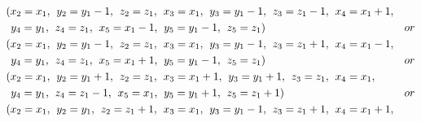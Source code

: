 \begin{align*}
&(x_{2}=x_{1},\hspace{1ex} y_{2}=y_{1}-1,\hspace{1ex} z_{2}=z_{1},\hspace{1ex} x_{3}=x_{1},\hspace{1ex} y_{3}=y_{1}-1,\hspace{1ex} z_{3}=z_{1}-1,\hspace{1ex} x_{4}=x_{1}+1,\\
&\hspace{1ex} y_{4}=y_{1},\hspace{1ex} z_{4}=z_{1},\hspace{1ex} x_{5}=x_{1}-1,\hspace{1ex} y_{5}=y_{1}-1,\hspace{1ex} z_{5}=z_{1})&or\\ 
&(x_{2}=x_{1},\hspace{1ex} y_{2}=y_{1}-1,\hspace{1ex} z_{2}=z_{1},\hspace{1ex} x_{3}=x_{1},\hspace{1ex} y_{3}=y_{1}-1,\hspace{1ex} z_{3}=z_{1}+1,\hspace{1ex} x_{4}=x_{1}-1,\\
&\hspace{1ex} y_{4}=y_{1},\hspace{1ex} z_{4}=z_{1},\hspace{1ex} x_{5}=x_{1}+1,\hspace{1ex} y_{5}=y_{1}-1,\hspace{1ex} z_{5}=z_{1})&or\\ 
&(x_{2}=x_{1},\hspace{1ex} y_{2}=y_{1}+1,\hspace{1ex} z_{2}=z_{1},\hspace{1ex} x_{3}=x_{1}+1,\hspace{1ex} y_{3}=y_{1}+1,\hspace{1ex} z_{3}=z_{1},\hspace{1ex} x_{4}=x_{1},\\
&\hspace{1ex} y_{4}=y_{1},\hspace{1ex} z_{4}=z_{1}-1,\hspace{1ex} x_{5}=x_{1},\hspace{1ex} y_{5}=y_{1}+1,\hspace{1ex} z_{5}=z_{1}+1)&or\\ 
&(x_{2}=x_{1},\hspace{1ex} y_{2}=y_{1},\hspace{1ex} z_{2}=z_{1}+1,\hspace{1ex} x_{3}=x_{1},\hspace{1ex} y_{3}=y_{1}-1,\hspace{1ex} z_{3}=z_{1}+1,\hspace{1ex} x_{4}=x_{1}+1,\\

\end{align*}

